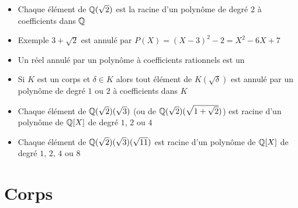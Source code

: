 \begin{frame}


\pause

\begin{itemize}[<+->]
  \item Chaque élément de $\mathbb{Q}(\sqrt 2)$ est la racine d'un polynôme de degré $2$
à coefficients dans $\mathbb{Q}$

  \item Exemple $3+\sqrt 2$ est annulé par $P(X) = (X-3)^2 -2 = X^2-6X+7$
  
  \item Un réel annulé par un polynôme à coefficients rationnels est un 
  
  \item Si $K$ est un corps et $\delta \in K$ alors tout élément de $K(\sqrt \delta)$
est annulé par un polynôme de degré $1$ ou $2$ à coefficients dans $K$

  \item Chaque élément de $\mathbb{Q}(\sqrt2)(\sqrt 3)$ (ou de $\mathbb{Q}(\sqrt2)(\sqrt{1+\sqrt2})$)
est racine d'un polynôme de $\mathbb{Q}[X]$ de degré $1$, $2$ ou $4$

  \item Chaque élément de $\mathbb{Q}(\sqrt2)(\sqrt 3)(\sqrt {11})$ est racine d'un polynôme 
de $\mathbb{Q}[X]$ de degré $1$, $2$, $4$ ou $8$
\end{itemize}
\end{frame}



\section{Corps}


